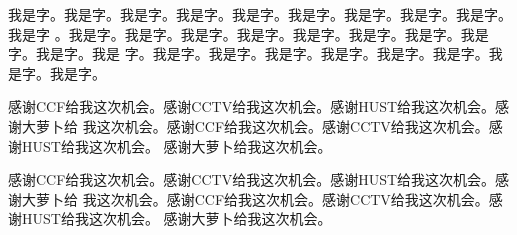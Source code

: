 \documentclass[supercite]{HustGraduPaper}
\theoremstyle{definition}
\begin{document}
我是字。我是字。我是字。我是字。我是字。我是字。我是字。我是字。我是字。我是字
。我是字。我是字。我是字。我是字。我是字。我是字。我是字。我是字。我是字。我是
字。我是字。我是字。我是字。我是字。我是字。我是字。我是字。我是字。

\begin{thankpage}

感谢CCF给我这次机会。感谢CCTV给我这次机会。感谢HUST给我这次机会。感谢大萝卜给
我这次机会。感谢CCF给我这次机会。感谢CCTV给我这次机会。感谢HUST给我这次机会。
感谢大萝卜给我这次机会。

感谢CCF给我这次机会。感谢CCTV给我这次机会。感谢HUST给我这次机会。感谢大萝卜给
我这次机会。感谢CCF给我这次机会。感谢CCTV给我这次机会。感谢HUST给我这次机会。
感谢大萝卜给我这次机会。

\end{thankpage}

\nocite{*}





\end{document}
